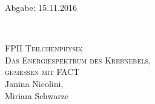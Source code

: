 



\begin{titlepage}
  \begin{flushleft}
 Abgabe: 15.11.2016
  \end{flushleft}


\HRule\\[1,0cm]

 \begin{center}


\textsc{\LARGE FPII Teilchenphysik}\\[1.5cm]
\textsc{\huge Das Energiespektrum des Krebnebels,\\ gemessen mit FACT} \\[5,5cm]

Janina Nicolini\footnotemark[1], \\
Miriam Schwarze\footnotemark[2] \\[1,0cm]



 \end{center}
\HRule

 \vfill

\end{titlepage}






\printbibliography


